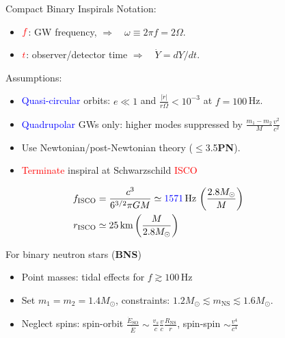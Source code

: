 \documentclass[xcolor=dvipsnames,handout,t]{beamer}
\newcommand{\red}[1]{\textcolor{red}{#1}}
\newcommand{\bl}[1]{\textcolor{blue}{#1}}
\newcommand{\f}{\frac}
\begin{document}
\begin{frame}{Compact Binary Inspirals}
  \vspace{-3mm}
  Notation:
  \begin{itemize}
    \item $\red{f} $: GW frequency, \hspace{1.5cm} $\Longrightarrow\quad \omega\equiv2\pi f = 2\Omega$.
    \item $\red{t}$: observer/detector time \quad$ \Longrightarrow\quad\dot{Y}= dY/dt$.
  \end{itemize}
  {
    Assumptions:
    \begin{itemize}
      \item \bl{Quasi-circular} orbits: $e \ll 1$ and $\tfrac{|\dot{r}|}{r\Omega} <10^{-3} $ at $f=100\,$Hz.
      \item \bl{Quadrupolar} GWs only: higher modes suppressed by $\tfrac{m_1-m_2}{M}\tfrac{v^2}{c^2}$
      \item Use Newtonian/post-Newtonian theory ($\le$3.5{\bf PN}).
      \item \red{Terminate} inspiral at Schwarzschild \red{ISCO} 
      \begin{footnotesize}
      \begin{align*}
      f_\text{ISCO} &= \f{c^3}{6^{3/2}\pi G M} \simeq \bl{1571}\,\text{Hz}\, \left(\f{2.8M_\odot}{M}\right)\hspace{2cm}\\ 
      r_\text{ISCO} &\simeq 25\,\text{km}\left(\frac{M}{2.8 M_\odot}\right)
      \end{align*}
      \end{footnotesize}
    \end{itemize}
   } 
  {
    \vspace{1mm}
    For binary neutron stars ({\bf BNS})
    \begin{itemize}
      \item Point masses: tidal effects for $f \gtrsim 100\,$Hz
      \item Set $m_1 =m_2 = 1.4 M_\odot$, constraints: $1.2 M_\odot \lesssim m_\text{NS}\lesssim 1.6M_\odot$.
      \item Neglect spins: spin-orbit $\tfrac{\dot{E}_\text{SO}}{\dot{E}} \sim \tfrac{v_s}{c}\tfrac{v}{c}\tfrac{R_\text{NS}}{r}$, spin-spin $\sim \tfrac{v^4}{c^4}$
    \end{itemize}
  }
  {
  }  
\end{frame}
\end{document}
